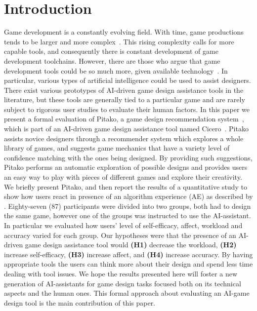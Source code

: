 \documentclass[letterpaper]{article} %
\newcommand{\dan}[1]{\textcolor{orange}{Dan: \textbf{#1}}}
\begin{document}
\section{Introduction}
Game development is a constantly evolving field. With time, game productions tends to be larger and more complex~\cite{Blow:2004:GDH:971564.971590}.
This rising complexity calls for more capable tools, and consequently there is constant development of game development toolchains.
However, there are those who argue that game development tools could be so much more, given available technology~\cite{Kasurinen:2013:GDE:2460999.2461004}.
In particular, various types of artificial intelligence could be used to assist designers. There exist various prototypes of AI-driven game design assistance tools in the literature, but these tools are generally tied to a particular game and are rarely subject to rigorous user studies to evaluate their human factors.
In this paper we present a formal evaluation of Pitako, a game design recommendation system~\cite{machado2019pitako}, which is part of an AI-driven game design assistance tool named Cicero~\cite{Machado2018AIAssistedGD}. Pitako assists novice designers through a recommender system which explores a whole library of games, and suggests game mechanics that have a variety level of confidence matching with the ones being designed. By providing such suggestions, Pitako performs an automatic exploration of possible designs and provides users an easy way to play with pieces of different games and explore their creativity\cite{Shneiderman:2007:CST:1323688.1323689}. %
We briefly present Pitako, and then report the results of a quantitative study to show how users react in presence of an algorithm experience (AE) as described by \cite{Oh:2017:UVT:3025453.3025539}. Eighty-seven (87) participants were divided into two groups, both had to design the same game, however one of the groups was instructed to use the AI-assistant. In particular we evaluated how users' level of self-efficacy, affect, workload and accuracy varied for each group. Our hypotheses were that the presence of an AI-driven game design assistance tool would \textbf{(H1)} decrease the workload, \textbf{(H2)} increase self-efficacy, \textbf{(H3)} increase affect, and \textbf{(H4)} increase accuracy. By having appropriate tools the users can think more about their design and spend less time dealing with tool issues\cite{Shneiderman:2007:CST:1323688.1323689}. We hope the results presented here will foster a new generation of AI-assistants for game design tasks focused both on its technical aspects and the human ones. This formal approach about evaluating an AI-game design tool is the main contribution of this paper. %
\end{document}
